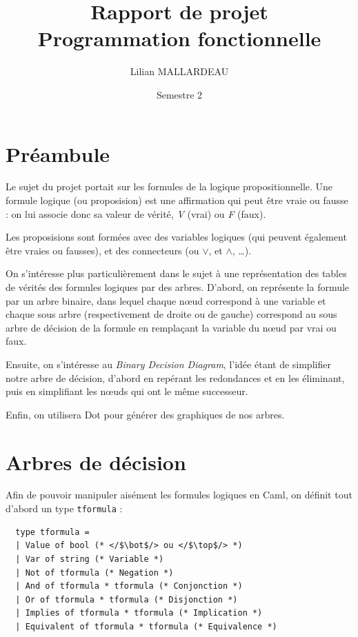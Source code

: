 \documentclass[a4paper,11pt]{article}
\title{Rapport de projet\\Programmation fonctionnelle}
\author{Lilian MALLARDEAU}
\date{Semestre 2}
\newcommand{\caml}[1]{\lstinline{#1}}
\begin{document}
\maketitle
\tableofcontents
\pagebreak

\section*{Préambule}
Le sujet du projet portait sur les formules de la logique propositionnelle. Une formule logique (ou proposision) est une affirmation qui peut être vraie ou fausse : on lui associe donc sa valeur de vérité, \textit{V} (vrai) ou \textit{F} (faux).

Les proposisions sont formées avec des variables logiques (qui peuvent également être vraies ou fausses), et des connecteurs (ou $\lor$, et $\land$, \dots).

\bigskip

On s'intéresse plus particulièrement dans le sujet à une représentation des tables de vérités des formules logiques par des arbres. D'abord, on représente la formule par un arbre binaire, dans lequel chaque nœud correspond à une variable et chaque sous arbre (respectivement de droite ou de gauche) correspond au sous arbre de décision de la formule en remplaçant la variable du nœud par vrai ou faux.

\bigskip

Ensuite, on s'intéresse au \textit{Binary Decision Diagram}, l'idée étant de simplifier notre arbre de décision, d'abord en repérant les redondances et en les éliminant, puis en simplifiant les nœuds qui ont le même successeur.

\bigskip

Enfin, on utilisera Dot pour générer des graphiques de nos arbres.


\pagebreak

\section*{Arbres de décision}

Afin de pouvoir manipuler aisément les formules logiques en Caml, on définit tout d'abord un type \caml{tformula} :

\begin{lstlisting}
  type tformula =
  | Value of bool (* </$\bot$/> ou </$\top$/> *)
  | Var of string (* Variable *)
  | Not of tformula (* Negation *)
  | And of tformula * tformula (* Conjonction *)
  | Or of tformula * tformula (* Disjonction *)
  | Implies of tformula * tformula (* Implication *)
  | Equivalent of tformula * tformula (* Equivalence *)
\end{lstlisting}
\end{document}
